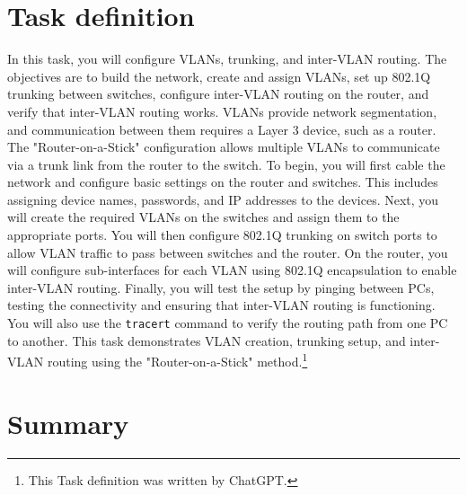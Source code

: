 \documentclass[a4paper]{article}
\newcommand{\abc}{\hfill \break}
\begin{document}
\newpage

\section{Task definition}

In this task, you will configure VLANs, trunking, and inter-VLAN routing. The objectives are to build the network, create and assign VLANs, set up 802.1Q trunking between switches, configure inter-VLAN routing on the router, and verify that inter-VLAN routing works.\abc
VLANs provide network segmentation, and communication between them requires a Layer 3 device, such as a router. The "Router-on-a-Stick" configuration allows multiple VLANs to communicate via a trunk link from the router to the switch. \abc
To begin, you will first cable the network and configure basic settings on the router and switches. This includes assigning device names, passwords, and IP addresses to the devices. Next, you will create the required VLANs on the switches and assign them to the appropriate ports. You will then configure 802.1Q trunking on switch ports to allow VLAN traffic to pass between switches and the router. \abc
On the router, you will configure sub-interfaces for each VLAN using 802.1Q encapsulation to enable inter-VLAN routing. Finally, you will test the setup by pinging between PCs, testing the connectivity and ensuring that inter-VLAN routing is functioning. You will also use the \texttt{tracert} command to verify the routing path from one PC to another.\abc
This task demonstrates VLAN creation, trunking setup, and inter-VLAN routing using the "Router-on-a-Stick" method.\footnote{This Task definition was written by ChatGPT.}

\section{Summary}
\end{document}
